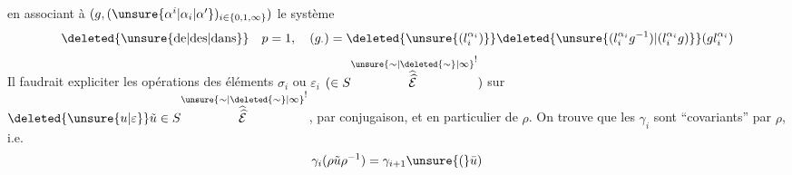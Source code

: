 en associant à $(g,(\unsure{\alpha^i|\alpha_i|\alpha'})_{i\in\{0,1,\infty\}})$ le système
\[
\deleted{\text{\unsure{de|des|dans}}}\quad p=1,\quad(g_\cdot)=\deleted{\unsure{(l_i^{\alpha_i})}}\deleted{\unsure{(l_i^{\alpha_i}g^{-1})|(l_i^{\alpha_i}g)}}(gl_i^{\alpha_i})
\]
Il faudrait expliciter les opérations des éléments $\sigma_i$ ou $\varepsilon_i$  $(\in S\overset{\unsure{\sim|\deleted{\sim}|\infty}}{\widehat{\widehat{\mathcal E}}}^{!})$ sur $\deleted{\unsure{u|\varepsilon}}\tilde u\in S\overset{\unsure{\sim|\deleted{\sim}|\infty}}{\widehat{\widehat{\mathcal E}}}^{!}$, par  conjugaison, et en particulier de $\rho$. On trouve que  les $\gamma_i$ sont ``covariants'' par $\rho$, i.e.
\[
\gamma_i(\rho\tilde u\rho^{-1})=\gamma_{i+1}\unsure{(}\bar u)
\]
